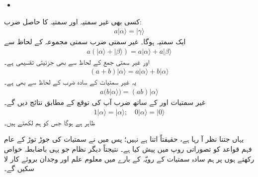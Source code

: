 \begin{itemize}
	\item {}
\end{itemize}
کسی بھی غیر سمتیہ اور سمتیہ کا حاصل ضرب:
\begin{align}
	a|\alpha\rangle=|\gamma\rangle
\end{align}
 ایک سمتیہ ہوگا۔ غیر سمتی ضرب سمتی مجموعہ کے لحاظ سے   
\begin{align}
	a(|\alpha\rangle+|\beta\rangle)=a|\alpha\rangle+a|\beta\rangle
\end{align}
اور  غیر سمتی جمع کے لحاظ سے بھی جزئیتی تقسیمی ہے۔
\begin{align}
	(a+b)|\alpha\rangle=a|\alpha\rangle+b|\alpha\rangle
\end{align}
یہ غیر سمتیات کے سادہ ضرب کے لحاظ سے  بھی ہے۔
\begin{align}
	a(b|\alpha\rangle)=(ab)|\alpha\rangle
\end{align}
غیر سمتیات  اور  کے ساتھ  ضرب آپ کی  توقع کے مطابق نتائج دیں گے۔
\begin{align}
1|\alpha\rangle=|\alpha\rangle; \quad  0|\alpha\rangle=|0\rangle
\end{align}
ظاہر ہے  ہوگا جس کو ہم    لکھتے ہیں۔

یہاں   جتنا  نظر آ رہا ہے،    حقیقتاً  اتنا ہے نہیں؛   پس میں نے سمتیات کی جوڑ توڑ کے عام فہم قواعد کو تصوراتی روپ  میں پیش کیا ہے۔ نتیجتاً دیگر نظام جو یہی باضابطہ خواص رکھتے ہوں پر ہم سادہ سمتیات کے رویّہ کے بارے میں  معلوم علم  اور وجدان بروئے کار  لا سکیں گے۔

